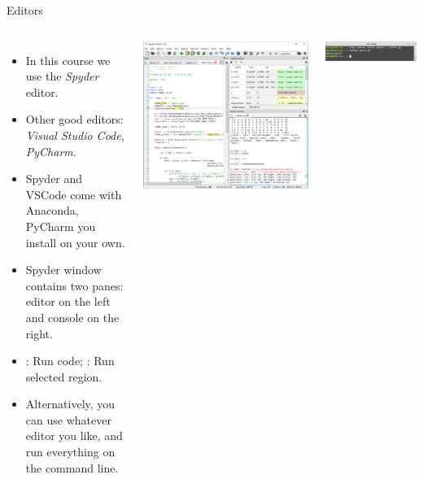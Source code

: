 \documentclass[10pt, aspectratio=169]{beamer} %
\begin{document}
\begin{frame}[fragile]{Editors}
\begin{columns}%
\begin{itemize}
\item In this course we use the \emph{Spyder} editor.
\item Other good editors: \emph{Visual Studio Code}, \emph{PyCharm}. 
\item Spyder and VSCode come with Anaconda, PyCharm you install on your own. 
\item Spyder window contains two panes: editor on the left and
console on the right.
\item {}: Run code; : Run selected region.
\item Alternatively, you can use whatever editor you like, and run
everything on the command line.
\end{itemize}
\vspace*{-0.5cm}
\includegraphics[width=1\columnwidth]{spyder.png}\\
\vspace*{0.2cm}
\centerline{\includegraphics[width=0.8\columnwidth]{helloworld.png}}
\end{columns}
\end{frame}
\end{document}
